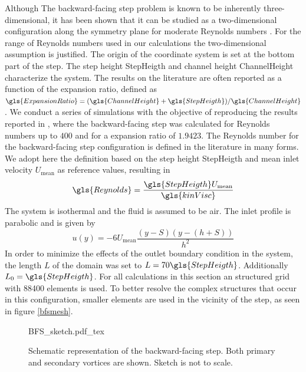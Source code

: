 Although The backward-facing step problem is known to be inherently three-dimensional, it has been shown that it can be studied as a two-dimensional configuration along the symmetry plane for moderate Reynolds numbers \citep{barkleyThreedimensionalInstabilityFlow2000, biswasBackwardFacingStepFlows2004}. For the range of Reynolds numbers used in our calculations the two-dimensional assumption is justified.  The origin of the coordinate system is set at the bottom part of the step. The step height \gls{StepHeigth} and channel height \gls{ChannelHeight} characterize the system. The results on the literature are often reported as a function of the expansion ratio, defined as $\gls{ExpansionRatio} = (\gls{ChannelHeight}+\gls{StepHeigth})/\gls{ChannelHeight}$. 
We conduct a series of simulations with the objective of reproducing the results reported in \cite{biswasBackwardFacingStepFlows2004}, where the backward-facing step was calculated for Reynolds numbers up to $400$ and for a expansion ratio of $1.9423$. 
The Reynolds number for the backward-facing step configuration is defined in the literature in many forms. We adopt here the definition based on the step height \gls{StepHeigth} and mean inlet velocity $U_{\text{mean}}$ as reference values, resulting in
\begin{equation}
\gls{Reynolds}= \frac{\gls{StepHeigth}U_{\text{mean}}}{\gls{kinVisc}}
\end{equation} 
The system is isothermal and the fluid is assumed to be air. The inlet profile is parabolic and is given by
\begin{equation}
u(y) = -6U_{\text{mean}}\frac{(y-S)(y-(h+S))}{h^2}
\end{equation}
In order to minimize the effects of the outlet  boundary condition in the system, the length $L$ of the domain was set to $L = 70 \gls{StepHeigth}$. Additionally  $L_0 = \gls{StepHeigth}$. For all calculations in this section an structured grid with 88400 elements is used. To better resolve the complex structures that occur in this configuration, smaller elements are used in the vicinity of the step, as seen in figure \cref{bfsmesh}.

\begin{figure}[tb]
	\begin{center}
		\def\svgwidth{0.9\textwidth}
		{BFS_sketch.pdf_tex}		
		\caption{Schematic representation of the backward-facing step. Both primary and secondary vortices are shown. Sketch is not to scale.}
		\label{BFSsketch}
	\end{center}	
\end{figure} 

